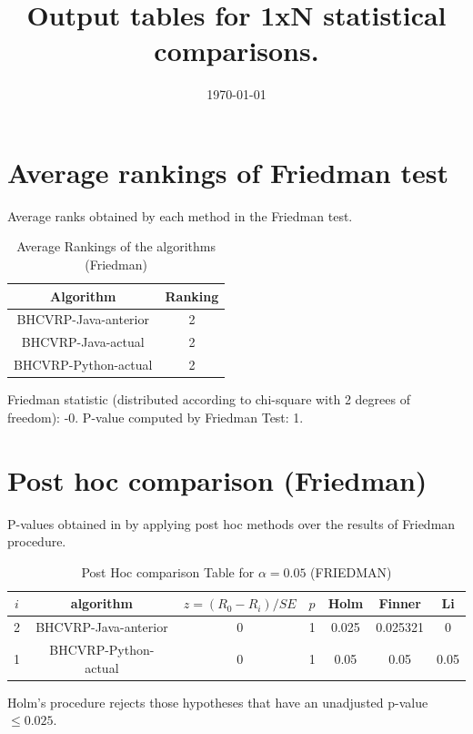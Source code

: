 \documentclass[a4paper,10pt]{article}
\title{Output tables for 1xN statistical comparisons.}
\author{}
\date{\today}
\begin{document}
\begin{landscape}
\pagestyle{empty}
\maketitle
\thispagestyle{empty}

\section{Average rankings of Friedman test}


Average ranks obtained by each method in the Friedman test.

\begin{table}[!htp]
\centering
\begin{tabular}{|c|c|}\hline
Algorithm&Ranking\\\hline
BHCVRP-Java-anterior&2\\BHCVRP-Java-actual&2\\BHCVRP-Python-actual&2\\\hline\end{tabular}
\caption{Average Rankings of the algorithms (Friedman)}
\end{table}

Friedman statistic (distributed according to chi-square with 2 degrees of freedom): -0. \newline P-value computed by Friedman Test: 1.\newline


\newpage

\section{Post hoc comparison (Friedman)}


P-values obtained in by applying post hoc methods over the results of Friedman procedure.

\begin{table}[!htp]
\centering\footnotesize
\begin{tabular}{ccccccc}
$i$&algorithm&$z=(R_0 - R_i)/SE$&$p$&Holm &Finner&Li\\
\hline2&BHCVRP-Java-anterior&0&1&0.025&0.025321&0\\1&BHCVRP-Python-actual&0&1&0.05&0.05&0.05\\\hline
\end{tabular}
\caption{Post Hoc comparison Table for $\alpha=0.05$ (FRIEDMAN)}
\end{table}Holm's procedure rejects those hypotheses that have an unadjusted p-value $\le0.025$.


\end{landscape}
\end{document}
